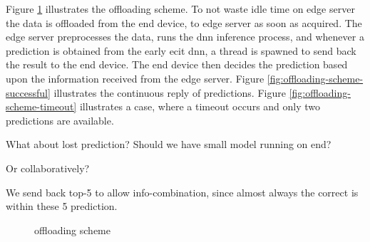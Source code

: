 Figure \ref{fig:offloading-scheme} illustrates the offloading scheme. To not waste idle time on edge server the data is offloaded from the end device, to edge server as soon as acquired. The edge server preprocesses the data, runs the \gls{dnn} inference process, and whenever a prediction is obtained from the early ecit \gls{dnn}, a thread is spawned to send back the result to the end device. The end device then decides the prediction based upon the information received from the edge server. Figure \ref{fig:offloading-scheme-successful} illustrates the continuous reply of predictions. Figure \ref{fig:offloading-scheme-timeout} illustrates a case, where a timeout occurs and only two predictions are available.

What about lost prediction? Should we have small model running on end?

Or collaboratively?

We send back top-5 to allow info-combination, since almost always the correct is within these 5 prediction. 

\begin{figure}
	\captionsetup[subfigure]{justification=centering}
	\hfill
	\caption[Offloading scheme]{offloading scheme}
	\label{fig:offloading-scheme}
\end{figure} 

